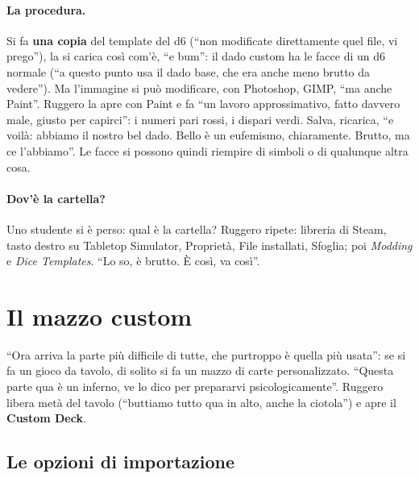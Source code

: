 \paragraph{La procedura.} Si fa \textbf{una copia} del template del d6 (``non
modificate direttamente quel file, vi prego''), la si carica così com'è, ``e bum'':
il dado custom ha le facce di un d6 normale (``a questo punto usa il dado base, che era
anche meno brutto da vedere''). Ma l'immagine si può modificare, con Photoshop, GIMP,
``ma anche Paint''. Ruggero la apre con Paint e fa ``un lavoro approssimativo, fatto
davvero male, giusto per capirci'': i numeri pari rossi, i dispari verdi. Salva,
ricarica, ``e voilà: abbiamo il nostro bel dado. Bello è un eufemismo, chiaramente.
Brutto, ma ce l'abbiamo''. Le facce si possono quindi riempire di simboli o di
qualunque altra cosa.

\paragraph{Dov'è la cartella?} Uno studente si è perso: qual è la cartella? Ruggero
ripete: libreria di Steam, tasto destro su Tabletop Simulator, Proprietà, File
installati, Sfoglia; poi \emph{Modding} e \emph{Dice Templates}. ``Lo so, è brutto. È
così, va così''.

\section{Il mazzo custom}
\label{a8:sec:mazzo}

``Ora arriva la parte più difficile di tutte, che purtroppo è quella più usata'': se si
fa un gioco da tavolo, di solito si fa un mazzo di carte personalizzato. ``Questa
parte qua è un inferno, ve lo dico per prepararvi psicologicamente''. Ruggero libera
metà del tavolo (``buttiamo tutto qua in alto, anche la ciotola'') e apre il
\textbf{Custom Deck}.

\subsection{Le opzioni di importazione}
\label{a8:sec:mazzo-opzioni}

